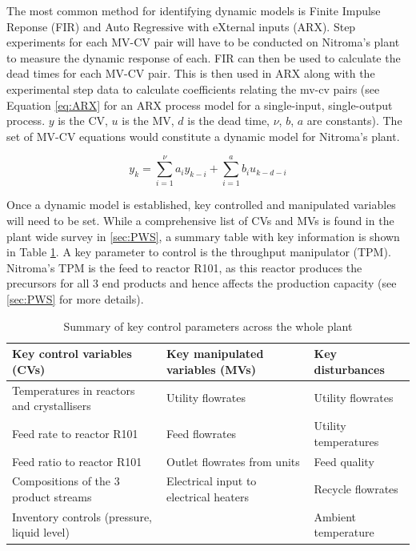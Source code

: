 The most common method for identifying dynamic models is Finite Impulse Reponse (FIR) and Auto Regressive with eXternal inputs (ARX). Step experiments for each MV-CV pair will have to be conducted on Nitroma's plant to measure the dynamic response of each. FIR can then be used to calculate the dead times for each MV-CV pair. This is then used in ARX along with the experimental step data to calculate coefficients relating the mv-cv pairs (see Equation \ref{eq:ARX} for an ARX process model for a single-input, single-output process. $y$ is the CV, $u$ is the MV, $d$ is the dead time, $\nu$, $b$, $a$ are constants). The set of MV-CV equations would constitute a dynamic model for Nitroma's plant. 

\begin{equation} \label{eq:ARX}
    y_k = \sum_{i=1}^{\nu}a_{i}y_{k-i} + \sum_{i=1}^{a}b_{i}u_{k-d-i}
\end{equation}

Once a dynamic model is established, key controlled and manipulated variables will need to be set. While a comprehensive list of CVs and MVs is found in the plant wide survey in \ref{sec:PWS}, a summary table with key information is shown in Table \ref{tab:key-parameters}. A key parameter to control is the throughput manipulator (TPM). Nitroma's TPM is the feed to reactor R101, as this reactor produces the precursors for all 3 end products and hence affects the production capacity (see \ref{sec:PWS} for more details).  

\begin{table}[h]
\centering
    \caption{Summary of key control parameters across the whole plant}
    \label{tab:key-parameters}
\begin{tabular}{@{}lll@{}}
\toprule
\textbf{Key control variables (CVs)}        & \textbf{Key manipulated variables (MVs)} & \textbf{Key disturbances} \\ \midrule
Temperatures in reactors and crystallisers  & Utility flowrates                        & Utility flowrates         \\
Feed rate to reactor R101                   & Feed flowrates                           & Utility temperatures      \\
Feed ratio to reactor R101                  & Outlet flowrates from units              & Feed quality              \\
Compositions of the 3 product streams       & Electrical input to electrical heaters   & Recycle flowrates         \\
Inventory controls (pressure, liquid level) &                                          & Ambient temperature       \\ \bottomrule
\end{tabular}
\end{table}

